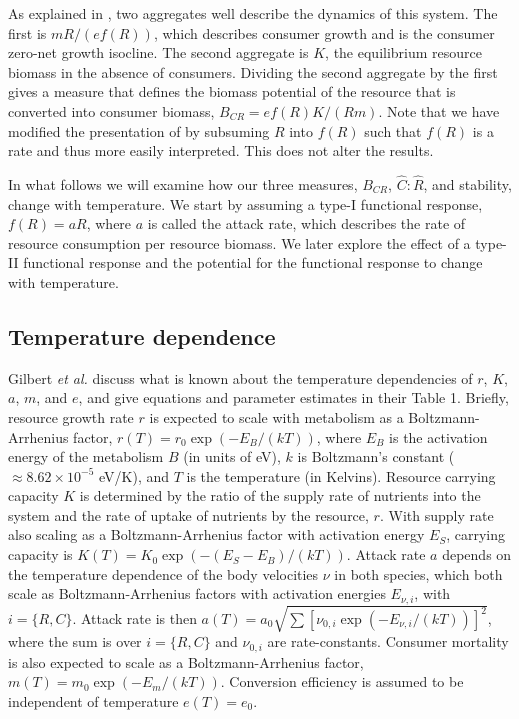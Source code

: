\documentclass[letter,12pt]{article}
\begin{document}
As explained in \cite{Gilbert2014}, two aggregates well describe the dynamics of this system.
The first is $m R/(e f(R))$, which describes consumer growth and is the consumer zero-net growth isocline.
The second aggregate is $K$, the equilibrium resource biomass in the absence of consumers.
Dividing the second aggregate by the first gives a measure that defines the biomass potential of the resource that is converted into consumer biomass, $B_{CR} = e f(R) K / (R m)$.
Note that we have modified the presentation of \cite{Gilbert2014} by subsuming $R$ into $f(R)$ such that $f(R)$ is  a rate and thus more easily interpreted.
This does not alter the results.

In what follows we will examine how our three measures, $B_{CR}$, $\hat{C}:\hat{R}$, and stability, change with temperature.
We start by assuming a type-I functional response, $f(R) = a R$, where $a$ is called the attack rate, which describes the rate of resource consumption per resource biomass.
We later explore the effect of a type-II functional response and the potential for the functional response to change with temperature.

\subsection{Temperature dependence}

Gilbert \textit{et al.} \cite{Gilbert2014} discuss what is known about the temperature dependencies of $r$, $K$, $a$, $m$, and $e$, and give equations and parameter estimates in their Table 1.
Briefly, resource growth rate $r$ is expected to scale with metabolism as a Boltzmann-Arrhenius factor, $r(T) = r_0 \exp(-E_B/(kT))$, where $E_B$ is the activation energy of the metabolism $B$ (in units of eV), $k$ is Boltzmann's constant ($\approx 8.62 \times 10^{-5}$ eV/K), and $T$ is the temperature (in Kelvins).
Resource carrying capacity $K$ is determined by the ratio of the supply rate of nutrients into the system and the rate of uptake of nutrients by the resource, $r$.
With supply rate also scaling as a Boltzmann-Arrhenius factor with activation energy $E_S$, carrying capacity is  $K(T) = K_0 \exp(-(E_S - E_B)/(kT))$. 
Attack rate $a$ depends on the temperature dependence of the body velocities $\nu$ in both species, which both scale as Boltzmann-Arrhenius factors with activation energies $E_{\nu,i}$, with $i=\{R,C\}$.
Attack rate is then $a(T) = a_0 \sqrt{\sum \left[\nu_{0,i} \exp(-E_{\nu,i}/(kT)) \right]^2}$, where the sum is over $i=\{R,C\}$ and $\nu_{0,i}$ are rate-constants.
Consumer mortality is also expected to scale as a Boltzmann-Arrhenius factor, $m(T) = m_0 \exp(-E_m/(kT))$.
Conversion efficiency is assumed to be independent of temperature $e(T) = e_0$.
\end{document}
